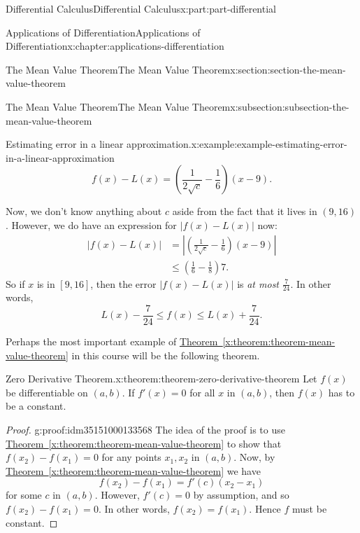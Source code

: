\documentclass[twoside,10pt,]{tufte-book}
\newcommand{\xreffont}{\relax}
\numberwithin{equation}{part}
\begin{document}
\begin{partptx}{Differential Calculus}{}{Differential Calculus}{}{}{x:part:part-differential}
\begin{chapterptx}{Applications of Differentiation}{}{Applications of Differentiation}{}{}{x:chapter:applications-differentiation}
\begin{sectionptx}{The Mean Value Theorem}{}{The Mean Value Theorem}{}{}{x:section:section-the-mean-value-theorem}
\begin{subsectionptx}{The Mean Value Theorem}{}{The Mean Value Theorem}{}{}{x:subsection:subsection-the-mean-value-theorem}
\begin{example}{Estimating error in a linear approximation.}{x:example:example-estimating-error-in-a-linear-approximation}
\begin{equation*}
f(x) - L(x) = \left(\frac{1}{2\sqrt{c}} - \frac{1}{6}\right)(x-9).
\end{equation*}
%
\par
Now, we don't know anything about \(c\) aside from the fact that it lives in \((9,16)\). However, we do have an expression for \(|f(x) - L(x)|\) now:%
\begin{align*}
|f(x) - L(x)| & = \left|\left(\frac{1}{2\sqrt{c}} - \frac{1}{6}\right)(x-9)\right|\\
& \leq \left(\frac{1}{6} - \frac{1}{8}\right)7. 
\end{align*}
So if \(x\) is in \([9,16]\), then the error \(|f(x) - L(x)|\) is \emph{at most} \(\frac{7}{24}\). In other words,%
\begin{equation*}
L(x) - \frac{7}{24} \leq f(x) \leq L(x) + \frac{7}{24}.
\end{equation*}
%
\end{example}
Perhaps the most important example of \hyperref[x:theorem:theorem-mean-value-theorem]{Theorem~{\xreffont\ref{x:theorem:theorem-mean-value-theorem}}} in this course will be the following theorem.%
\begin{theorem}{Zero Derivative Theorem.}{}{x:theorem:theorem-zero-derivative-theorem}%
Let \(f(x)\) be differentiable on \((a,b)\). If \(f'(x) = 0\) for all \(x\) in \((a,b)\), then \(f(x)\) has to be a constant.%
\end{theorem}
\begin{proof}{}{g:proof:idm35151000133568}
The idea of the proof is to use \hyperref[x:theorem:theorem-mean-value-theorem]{Theorem~{\xreffont\ref{x:theorem:theorem-mean-value-theorem}}} to show that \(f(x_{2}) - f(x_{1}) = 0\) for any points \(x_{1},x_{2}\) in \((a,b)\). Now, by \hyperref[x:theorem:theorem-mean-value-theorem]{Theorem~{\xreffont\ref{x:theorem:theorem-mean-value-theorem}}} we have%
\begin{equation*}
f(x_{2}) - f(x_{1}) = f'(c)(x_{2}-x_{1})
\end{equation*}
for some \(c\) in \((a,b)\). However, \(f'(c) = 0\) by assumption, and so \(f(x_{2}) - f(x_{1}) = 0\). In other words, \(f(x_{2}) = f(x_{1})\). Hence \(f\) must be constant.%
\end{proof}
\end{subsectionptx}
\end{sectionptx}
%
%
\typeout{************************************************}
\typeout{************************************************}

\end{chapterptx}
\end{partptx}
\end{document}
